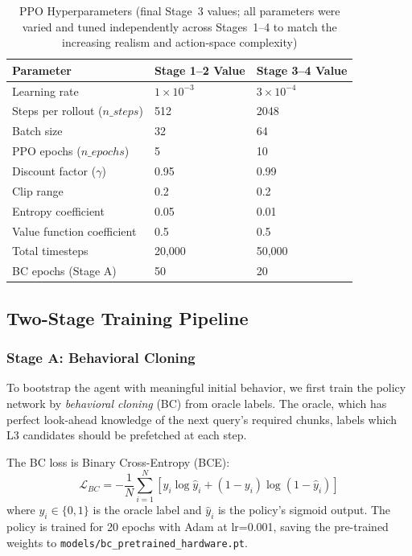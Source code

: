 \documentclass[conference]{IEEEtran}
\begin{document}
\begin{table}[htbp]
\centering
\caption{PPO Hyperparameters (final Stage~3 values; all parameters were varied and tuned independently across Stages~1--4 to match the increasing realism and action-space complexity)}
\label{tab:ppo_hp}
\begin{tabular}{@{}lll@{}}
\toprule
\textbf{Parameter} & \textbf{Stage 1--2 Value} & \textbf{Stage 3--4 Value} \\
\midrule
Learning rate & $1 \times 10^{-3}$ & $3 \times 10^{-4}$ \\
Steps per rollout ($n\_steps$) & 512 & 2048 \\
Batch size & 32 & 64 \\
PPO epochs ($n\_epochs$) & 5 & 10 \\
Discount factor ($\gamma$) & 0.95 & 0.99 \\
Clip range & 0.2 & 0.2 \\
Entropy coefficient & 0.05 & 0.01 \\
Value function coefficient & 0.5 & 0.5 \\
Total timesteps & 20{,}000 & 50{,}000 \\
BC epochs (Stage A) & 50 & 20 \\
\bottomrule
\end{tabular}
\end{table}

\subsection{Two-Stage Training Pipeline}

\subsubsection{Stage A: Behavioral Cloning}

To bootstrap the agent with meaningful initial behavior, we first train the policy network by \emph{behavioral cloning} (BC) from oracle labels. The oracle, which has perfect look-ahead knowledge of the next query's required chunks, labels which L3 candidates should be prefetched at each step.

The BC loss is Binary Cross-Entropy (BCE):
\begin{equation}
\mathcal{L}_{BC} = -\frac{1}{N}\sum_{i=1}^{N} \left[ y_i \log \hat{y}_i + (1-y_i)\log(1-\hat{y}_i) \right]
\end{equation}
where $y_i \in \{0,1\}$ is the oracle label and $\hat{y}_i$ is the policy's sigmoid output. The policy is trained for 20 epochs with Adam at lr=0.001, saving the pre-trained weights to \texttt{models/bc\_pretrained\_hardware.pt}.
\end{document}
